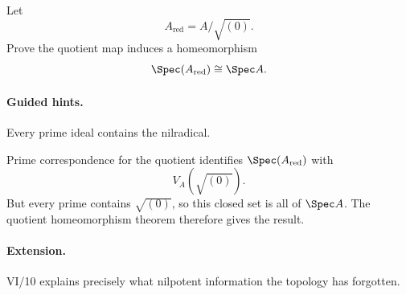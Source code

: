 \begin{problem}
Let
\[
A_{\mathrm{red}}=A/\sqrt{(0)}.
\]
Prove the quotient map induces a homeomorphism
\[
\Spec(A_{\mathrm{red}})\cong\Spec A.
\]
\end{problem}
\paragraph{Guided hints.}
Every prime ideal contains the nilradical.
\begin{solution}
Prime correspondence for the quotient identifies $\Spec(A_{\mathrm{red}})$ with
\[
V_A(\sqrt{(0)}).
\]
But every prime contains $\sqrt{(0)}$, so this closed set is all of $\Spec A$.  The quotient
homeomorphism theorem therefore gives the result.
\end{solution}
\paragraph{Extension.}
VI/10 explains precisely what nilpotent information the topology has forgotten.
